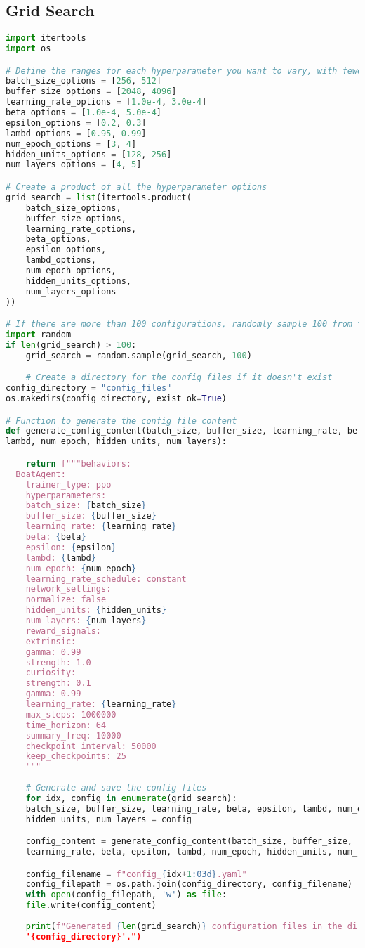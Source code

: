 \subsection{Grid Search}\label{gridsearch}
\begin{lstlisting}[language=Python]
import itertools
import os

# Define the ranges for each hyperparameter you want to vary, with fewer options
batch_size_options = [256, 512]
buffer_size_options = [2048, 4096]
learning_rate_options = [1.0e-4, 3.0e-4]
beta_options = [1.0e-4, 5.0e-4]
epsilon_options = [0.2, 0.3]
lambd_options = [0.95, 0.99]
num_epoch_options = [3, 4]
hidden_units_options = [128, 256]
num_layers_options = [4, 5]

# Create a product of all the hyperparameter options
grid_search = list(itertools.product(
    batch_size_options,
    buffer_size_options,
    learning_rate_options,
    beta_options,
    epsilon_options,
    lambd_options,
    num_epoch_options,
    hidden_units_options,
    num_layers_options
))

# If there are more than 100 configurations, randomly sample 100 from them
import random
if len(grid_search) > 100:
    grid_search = random.sample(grid_search, 100)

    # Create a directory for the config files if it doesn't exist
config_directory = "config_files"
os.makedirs(config_directory, exist_ok=True)

# Function to generate the config file content
def generate_config_content(batch_size, buffer_size, learning_rate, beta, epsilon, 
lambd, num_epoch, hidden_units, num_layers):

    return f"""behaviors:
  BoatAgent:
    trainer_type: ppo
    hyperparameters:
    batch_size: {batch_size}
    buffer_size: {buffer_size}
    learning_rate: {learning_rate}
    beta: {beta}
    epsilon: {epsilon}
    lambd: {lambd}
    num_epoch: {num_epoch}
    learning_rate_schedule: constant
    network_settings:
    normalize: false
    hidden_units: {hidden_units}
    num_layers: {num_layers}
    reward_signals:
    extrinsic:
    gamma: 0.99
    strength: 1.0
    curiosity:
    strength: 0.1
    gamma: 0.99
    learning_rate: {learning_rate}
    max_steps: 1000000
    time_horizon: 64
    summary_freq: 10000
    checkpoint_interval: 50000
    keep_checkpoints: 25
    """
    
    # Generate and save the config files
    for idx, config in enumerate(grid_search):
    batch_size, buffer_size, learning_rate, beta, epsilon, lambd, num_epoch, 
    hidden_units, num_layers = config

    config_content = generate_config_content(batch_size, buffer_size, 
    learning_rate, beta, epsilon, lambd, num_epoch, hidden_units, num_layers)

    config_filename = f"config_{idx+1:03d}.yaml"
    config_filepath = os.path.join(config_directory, config_filename)
    with open(config_filepath, 'w') as file:
    file.write(config_content)
    
    print(f"Generated {len(grid_search)} configuration files in the directory 
    '{config_directory}'.")
    
    
  \end{lstlisting}

